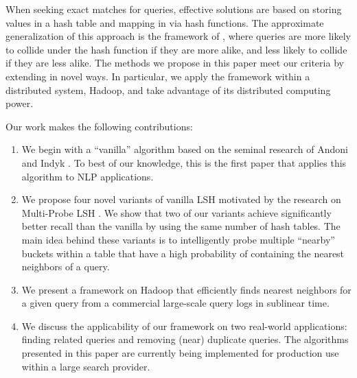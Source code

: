 When seeking exact matches for queries, effective solutions
are based on storing values in a hash table and mapping in via hash
functions. 
The approximate generalization of this approach is the framework of
\lshf, where queries are more likely to collide
under the hash function if they are more alike, and less likely to collide
if they are less alike. 
The methods we propose in this paper meet our criteria by extending \lshf 
\cite{Indyk98STOC,Charikar02STOC,Andoni06FOCS,Andoni08CACM}  in novel ways. 
In particular, we apply the framework within a distributed 
system, Hadoop, and take advantage of its distributed computing power.

Our work makes the following contributions: 
\begin{enumerate}
\item We begin with a ``vanilla'' \lsh algorithm based on the seminal
  research of Andoni and Indyk  .
 To best of our knowledge, this is the first paper that applies this algorithm to NLP applications. 
\item We propose four novel variants of vanilla LSH motivated by the
  research on Multi-Probe LSH \cite{LvVLDB07}.  We show that two of
  our variants achieve significantly better recall than the vanilla
  \lsh by using the same number of hash tables. The main idea behind
  these variants is to intelligently probe multiple ``nearby'' buckets within a table that have a high probability of containing the nearest neighbors of a query.  
\item We present a framework on Hadoop that efficiently finds nearest neighbors for a given query from a commercial large-scale query logs in sublinear time. %
\item  We discuss the applicability of our framework on two real-world
  applications: finding related queries and removing (near) duplicate
  queries. The algorithms presented in this paper are currently being
implemented for production use within a large search provider. 
\end{enumerate}

